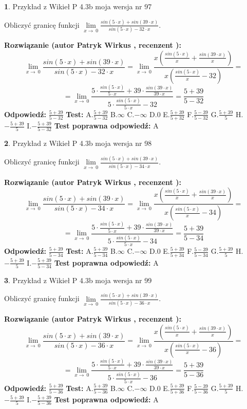 \documentclass[12pt, a4paper]{article}
\theoremstyle{definition} %
\newtheorem{zad}{}
\newcommand{\zadStart}[1]{\begin{zad}#1\newline}
\newcommand{\zadStop}{\end{zad}}
\newcommand{\rozwStart}[2]{\noindent \textbf{Rozwiązanie (autor #1 , recenzent #2): }\newline}
\newcommand{\rozwStop}{\newline}
\newcommand{\odpStart}{\noindent \textbf{Odpowiedź:}\newline}
\newcommand{\odpStop}{\newline}
\newcommand{\testStart}{\noindent \textbf{Test:}\newline}
\newcommand{\testStop}{\newline}
\newcommand{\kluczStart}{\noindent \textbf{Test poprawna odpowiedź:}\newline}
\newcommand{\kluczStop}{\newline}
\begin{document}
\zadStart{Przykład z Wikieł P 4.3b moja wersja nr 97}


Obliczyć granicę funkcji $\lim\limits_{x\to\ 0}\frac{sin(5 \cdot x)+sin(39 \cdot x)}{sin(5 \cdot x)-32 \cdot x}$.
\zadStop
\rozwStart{Patryk Wirkus}{}
$$\lim\limits_{x\to\ 0}\frac{sin(5 \cdot x)+sin(39 \cdot x)}{sin(5 \cdot x)-32 \cdot x}=\lim\limits_{x\to\ 0}\frac{x(\frac{sin(5 \cdot x)}{x}+\frac{sin(39 \cdot x)}{x})}{x(\frac{sin(5 \cdot x)}{x}-32)}=$$
$$=\lim\limits_{x\to\ 0}\frac{5 \cdot \frac{sin(5 \cdot x)}{5 \cdot x}+39 \cdot \frac{sin(39 \cdot x)}{39 \cdot x}}{5 \cdot \frac{sin(5 \cdot x)}{5 \cdot x}-32}=\frac{5+39}{5-32}$$
\rozwStop
\odpStart
$\frac{5+39}{5-32}$
\odpStop
\testStart
A.$\frac{5+39}{5-32}$
B.$\infty$
C.$-\infty$
D.$0$
E.$\frac{5+39}{5+32}$
F.$\frac{5-39}{5-32}$
G.$\frac{5+39}{5}$
H.$-\frac{5+39}{5}$
I.$-\frac{5+39}{5-32}$
\testStop
\kluczStart
A
\kluczStop



\zadStart{Przykład z Wikieł P 4.3b moja wersja nr 98}


Obliczyć granicę funkcji $\lim\limits_{x\to\ 0}\frac{sin(5 \cdot x)+sin(39 \cdot x)}{sin(5 \cdot x)-34 \cdot x}$.
\zadStop
\rozwStart{Patryk Wirkus}{}
$$\lim\limits_{x\to\ 0}\frac{sin(5 \cdot x)+sin(39 \cdot x)}{sin(5 \cdot x)-34 \cdot x}=\lim\limits_{x\to\ 0}\frac{x(\frac{sin(5 \cdot x)}{x}+\frac{sin(39 \cdot x)}{x})}{x(\frac{sin(5 \cdot x)}{x}-34)}=$$
$$=\lim\limits_{x\to\ 0}\frac{5 \cdot \frac{sin(5 \cdot x)}{5 \cdot x}+39 \cdot \frac{sin(39 \cdot x)}{39 \cdot x}}{5 \cdot \frac{sin(5 \cdot x)}{5 \cdot x}-34}=\frac{5+39}{5-34}$$
\rozwStop
\odpStart
$\frac{5+39}{5-34}$
\odpStop
\testStart
A.$\frac{5+39}{5-34}$
B.$\infty$
C.$-\infty$
D.$0$
E.$\frac{5+39}{5+34}$
F.$\frac{5-39}{5-34}$
G.$\frac{5+39}{5}$
H.$-\frac{5+39}{5}$
I.$-\frac{5+39}{5-34}$
\testStop
\kluczStart
A
\kluczStop



\zadStart{Przykład z Wikieł P 4.3b moja wersja nr 99}


Obliczyć granicę funkcji $\lim\limits_{x\to\ 0}\frac{sin(5 \cdot x)+sin(39 \cdot x)}{sin(5 \cdot x)-36 \cdot x}$.
\zadStop
\rozwStart{Patryk Wirkus}{}
$$\lim\limits_{x\to\ 0}\frac{sin(5 \cdot x)+sin(39 \cdot x)}{sin(5 \cdot x)-36 \cdot x}=\lim\limits_{x\to\ 0}\frac{x(\frac{sin(5 \cdot x)}{x}+\frac{sin(39 \cdot x)}{x})}{x(\frac{sin(5 \cdot x)}{x}-36)}=$$
$$=\lim\limits_{x\to\ 0}\frac{5 \cdot \frac{sin(5 \cdot x)}{5 \cdot x}+39 \cdot \frac{sin(39 \cdot x)}{39 \cdot x}}{5 \cdot \frac{sin(5 \cdot x)}{5 \cdot x}-36}=\frac{5+39}{5-36}$$
\rozwStop
\odpStart
$\frac{5+39}{5-36}$
\odpStop
\testStart
A.$\frac{5+39}{5-36}$
B.$\infty$
C.$-\infty$
D.$0$
E.$\frac{5+39}{5+36}$
F.$\frac{5-39}{5-36}$
G.$\frac{5+39}{5}$
H.$-\frac{5+39}{5}$
I.$-\frac{5+39}{5-36}$
\testStop
\kluczStart
A
\kluczStop
\end{document}
